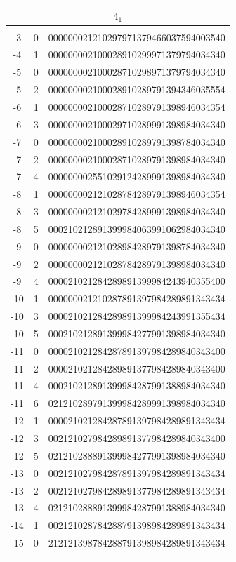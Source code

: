 \documentclass{article}
\begin{document}
\begin{supertabular}[h]{c c r}
\hline 
{}                            \\
\hline \\[-3pt]
-3    & 0  & 000000021210297971379466037594003540  \\
-4    & 1  & 000000002100028910299971379794034340  \\
-5    & 0  & 000000002100028710298971379794034340  \\
-5    & 2  & 000000002100028910289791394346035554  \\
-6    & 1  & 000000002100028710289791398946034354  \\
-6    & 3  & 000000002100029710289991398984034340  \\
-7    & 0  & 000000002100028910289791398784034340  \\
-7    & 2  & 000000002100028710289791398984034340  \\
-7    & 4  & 000000002551029124289991398984034340  \\
-8    & 1  & 000000002121028784289791398946034354  \\
-8    & 3  & 000000002121029784289991398984034340  \\
-8    & 5  & 000210212891399984063991062984034340  \\
-9    & 0  & 000000002121028984289791398784034340  \\
-9    & 2  & 000000002121028784289791398984034340  \\
-9    & 4  & 000021021284289891399984243940355400  \\
-10   & 1  & 000000021210287891397984289891343434  \\
-10   & 3  & 000021021284289891399984243991355434  \\
-10   & 5  & 000210212891399984277991398984034340  \\
-11   & 0  & 000021021284287891397984289840343400  \\
-11   & 2  & 000021021284289891377984289840343400  \\
-11   & 4  & 000210212891399984287991388984034340  \\
-11   & 6  & 021210289791399984289991398984034340  \\
-12   & 1  & 000021021284287891397984289891343434  \\
-12   & 3  & 002121027984289891377984289840343400  \\
-12   & 5  & 021210288891399984277991398984034340  \\
-13   & 0  & 002121027984287891397984289891343434  \\
-13   & 2  & 002121027984289891377984289891343434  \\
-13   & 4  & 021210288891399984287991388984034340  \\
-14   & 1  & 002121028784288791398984289891343434  \\
-15   & 0  & 212121398784288791398984289891343434  \\
\\[-5pt]


\end{supertabular}
\end{document}
